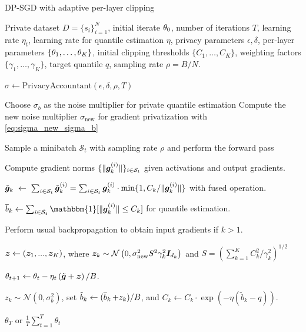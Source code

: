 \begin{algorithm}
\caption{DP-SGD with adaptive per-layer clipping}
\label{alg:perlayer-DPSGD}
\begin{algorithmic}[1]
Private dataset $D=\{s_i\}_{i=1}^N$, 
initial iterate $\mathbf{\theta}_0$, 
number of iterations $T$, 
learning rate $\eta_t$, 
learning rate for quantile estimation $\eta$, 
privacy parameters $\epsilon, \delta$, 
per-layer parameters $\{\mathbf{\theta}_1, \dots, \mathbf{\theta}_K\}$, 
initial  clipping thresholds $\{C_1,\dots, C_K\}$, 
weighting factors $\{\gamma_1,\dots,  \gamma_K\}$, 
target quantile $q$, 
sampling rate $\rho=B/N$.

\State $\sigma \leftarrow \text{PrivacyAccountant}(\epsilon, \delta, \rho, T)$


\State Choose $\sigma_b$ as the noise multiplier for private quantile estimation
\State Compute the new noise multiplier $\sigma_{\text{new}}$ for gradient privatization with \eqref{eq:sigma_new_sigma_b}



    \State Sample a minibatch $\mathcal{S}_t$ with sampling rate $\rho$ and perform the forward pass
    




        \State Compute gradient norms $\{\| \bm{g}_{k}^{(i)} \|\}_{i\in\mathcal{S}_t}$  given activations and output gradients.
        
        \State $\tilde{\bm{g}}_{k} \hspace{1mm} \gets \hspace{1mm}
            \sum_{i\in\mathcal{S}_t} \tilde{\bm{g}}_{k}^{(i)} = 
            \sum_{i\in\mathcal{S}_t} \bm{g}_{k}^{(i)} \cdot \min \{1, C_k / \| \bm{g}_{k}^{(i)} \| \} $ with fused operation.

        \State $\widebar{b}_k \gets \sum_{ i\in \mathcal{S}_t } \mathbbm{1}[ \|\vg_k^{(i)}\|\le C_k ] $ for quantile estimation.

        \State Perform usual backpropagation to obtain input gradients if $k > 1$.
    \EndFor

    
    \State $\bm{z} \gets (\bm{z}_1, ..., \bm{z}_K)$, where  $\bm{z}_k\sim\mathcal{N}\left(0,\sigma_{\text{new}}^2  S^2 \gamma_k^2 \bm{I}_{d_k}\right)$ and $S = (\sum_{k=1}^K C_k^2/\gamma_k^2)^{1/2}$

    \State $\mathbf{\theta}_{t+1} \gets \mathbf{\theta}_t-{\eta_t}\left(\tilde{\bm{g}}+ \bm{z}\right)/B$.
 

        
        \State $z_k \sim \mathcal{N}(0, \sigma_b^2) $, set $\tilde{b}_k \gets (\mathop{\overline{b}}_k+ z_k) / B$, and $C_k \leftarrow C_k \cdot \exp(-\eta(\tilde{b}_k-q))$. 
    \EndFor
\EndFor

\State \Return $\theta_{T}$ or $\frac{1}{T}\sum_{t=1}^T \theta_t$
\end{algorithmic}
\end{algorithm}















